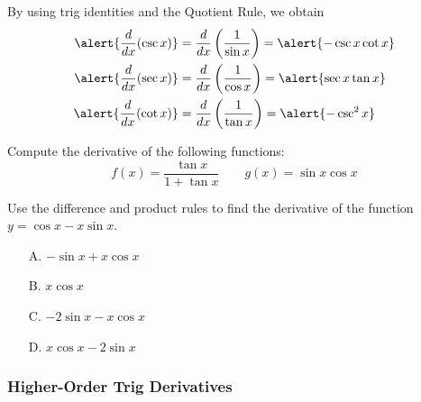 \documentclass[cal1spr16Lectures.tex]{subfiles}
\begin{document}
\begin{frame}{}
By using trig identities and the Quotient Rule, we obtain
\begin{align*}
\alert{\frac{d}{dx} (\csc x)} &= \frac{d}{dx} \left( \frac{1}{\sin x}\right) = \alert{-\csc x \cot x} \\
\alert{\frac{d}{dx} (\sec x)} &= \frac{d}{dx} \left( \frac{1}{\cos x}\right) = \alert{\sec x \tan x} \\
\alert{\frac{d}{dx} (\cot x)} &= \frac{d}{dx} \left( \frac{1}{\tan x}\right) = \alert{-\csc^2 x}  
\end{align*}
\end{frame}

\begin{frame}
\begin{exe} Compute the derivative of the following functions:
\[f(x)=\frac{\tan x}{1+\tan x} \qquad g(x)=\sin x \cos x\]
\end{exe}
\end{frame}

\begin{frame}
\begin{exe} 
Use the difference and product rules to find the derivative of the function $y=\cos x-x\sin x$.
\begin{itemize}
\item[A. ] $-\sin x+x\cos x$
\item[B. ] $x\cos x$
\item[C. ] $-2\sin x-x\cos x$
\item[D. ] $x\cos x-2\sin x$
\end{itemize}
\end{exe}
\end{frame}

\subsubsection{Higher-Order Trig Derivatives}
\end{document}
